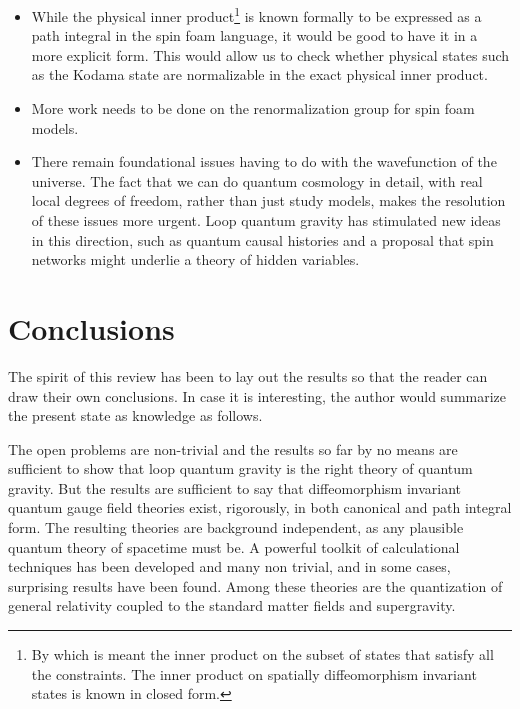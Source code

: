 \documentclass[12pt]{article}
\begin{document}
\begin{itemize}
    
    \item{}While the physical inner product\footnote{By which is meant 
    the inner product on the subset of states that satisfy all the 
    constraints. The inner product on spatially diffeomorphism 
    invariant states is known in closed form.} is known formally to be expressed 
    as a path integral in the spin foam language, it would be good to 
    have it in a more explicit form.  This would allow us to check 
    whether physical states such as the Kodama state are normalizable 
    in the exact physical inner product. 
    
    \item{}More work needs to be done on the renormalization group
for spin foam models\cite{f-RG,f-FRG}. 
    
    \item{}There remain foundational issues having to do with the 
    wavefunction of the universe. The fact that we can do quantum 
    cosmology in detail, with real local degrees of freedom, rather 
    than just study models, makes the resolution of these issues more urgent. 
   Loop quantum gravity has stimulated new ideas in this direction, such as 
quantum causal histories\cite{Fotini-Wheeler,algebraic-fotini} and a proposal 
that spin networks might underlie a theory of hidden variables\cite{hidden-graphs}.
    
\end{itemize}    

\section{Conclusions}

The spirit of this review has been to lay out the results so that the reader can draw their own
conclusions.  In case it is interesting, the author would summarize the present state as
knowledge as follows.   

The open problems are non-trivial and the results so far by no means are sufficient
to show that loop quantum gravity is the right theory of quantum gravity. But the results are
sufficient to say that diffeomorphism invariant quantum gauge field theories
exist, rigorously, in both canonical and path integral form. 
The resulting theories are background independent, as any plausible quantum theory of
spacetime must be.  A powerful toolkit
of calculational techniques has been developed and many non trivial, and in some
cases, surprising results have been found. Among these theories are the
quantization of general relativity  coupled to the standard matter fields and supergravity. 
\end{document}
